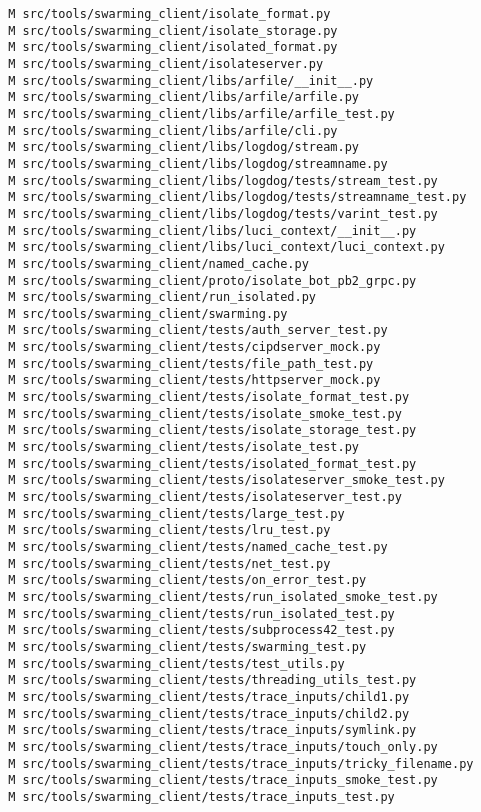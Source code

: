 \documentclass{article}
\begin{document}
\begin{verbatim}
 M src/tools/swarming_client/isolate_format.py
 M src/tools/swarming_client/isolate_storage.py
 M src/tools/swarming_client/isolated_format.py
 M src/tools/swarming_client/isolateserver.py
 M src/tools/swarming_client/libs/arfile/__init__.py
 M src/tools/swarming_client/libs/arfile/arfile.py
 M src/tools/swarming_client/libs/arfile/arfile_test.py
 M src/tools/swarming_client/libs/arfile/cli.py
 M src/tools/swarming_client/libs/logdog/stream.py
 M src/tools/swarming_client/libs/logdog/streamname.py
 M src/tools/swarming_client/libs/logdog/tests/stream_test.py
 M src/tools/swarming_client/libs/logdog/tests/streamname_test.py
 M src/tools/swarming_client/libs/logdog/tests/varint_test.py
 M src/tools/swarming_client/libs/luci_context/__init__.py
 M src/tools/swarming_client/libs/luci_context/luci_context.py
 M src/tools/swarming_client/named_cache.py
 M src/tools/swarming_client/proto/isolate_bot_pb2_grpc.py
 M src/tools/swarming_client/run_isolated.py
 M src/tools/swarming_client/swarming.py
 M src/tools/swarming_client/tests/auth_server_test.py
 M src/tools/swarming_client/tests/cipdserver_mock.py
 M src/tools/swarming_client/tests/file_path_test.py
 M src/tools/swarming_client/tests/httpserver_mock.py
 M src/tools/swarming_client/tests/isolate_format_test.py
 M src/tools/swarming_client/tests/isolate_smoke_test.py
 M src/tools/swarming_client/tests/isolate_storage_test.py
 M src/tools/swarming_client/tests/isolate_test.py
 M src/tools/swarming_client/tests/isolated_format_test.py
 M src/tools/swarming_client/tests/isolateserver_smoke_test.py
 M src/tools/swarming_client/tests/isolateserver_test.py
 M src/tools/swarming_client/tests/large_test.py
 M src/tools/swarming_client/tests/lru_test.py
 M src/tools/swarming_client/tests/named_cache_test.py
 M src/tools/swarming_client/tests/net_test.py
 M src/tools/swarming_client/tests/on_error_test.py
 M src/tools/swarming_client/tests/run_isolated_smoke_test.py
 M src/tools/swarming_client/tests/run_isolated_test.py
 M src/tools/swarming_client/tests/subprocess42_test.py
 M src/tools/swarming_client/tests/swarming_test.py
 M src/tools/swarming_client/tests/test_utils.py
 M src/tools/swarming_client/tests/threading_utils_test.py
 M src/tools/swarming_client/tests/trace_inputs/child1.py
 M src/tools/swarming_client/tests/trace_inputs/child2.py
 M src/tools/swarming_client/tests/trace_inputs/symlink.py
 M src/tools/swarming_client/tests/trace_inputs/touch_only.py
 M src/tools/swarming_client/tests/trace_inputs/tricky_filename.py
 M src/tools/swarming_client/tests/trace_inputs_smoke_test.py
 M src/tools/swarming_client/tests/trace_inputs_test.py

\end{verbatim}
\end{document}
